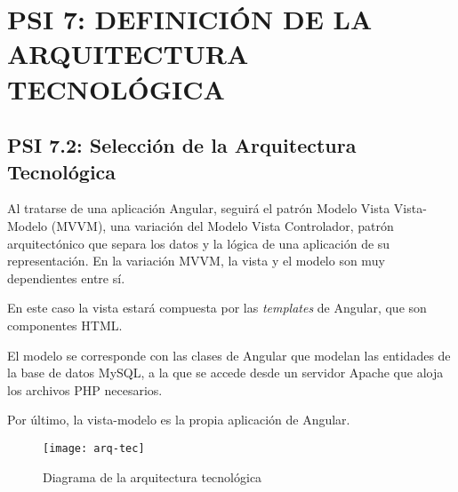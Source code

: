 % 
%
%
%


% 


\newpage

\section{PSI 7: DEFINICIÓN DE LA ARQUITECTURA TECNOLÓGICA}


\subsection{PSI 7.2: Selección de la Arquitectura Tecnológica} 
Al tratarse de una aplicación Angular, seguirá el patrón Modelo Vista Vista-Modelo (MVVM), una variación del Modelo Vista Controlador, patrón arquitectónico que separa los datos y la lógica de una aplicación de su representación. En la variación MVVM, la vista y el modelo son muy dependientes entre sí. \par 
En este caso la vista estará compuesta por las \textit{templates} de Angular, que son componentes HTML.\par
El modelo se corresponde con las clases de Angular que modelan las entidades de la base de datos MySQL, a la que se accede desde un servidor Apache que aloja los archivos PHP necesarios.\par
Por último, la vista-modelo es la propia aplicación de Angular.
\begin{figure}[H]
\vspace{4mm}
\centering
\centerline{\texttt{[image: arq-tec]}}
\caption{Diagrama de la arquitectura tecnológica}
\end{figure}